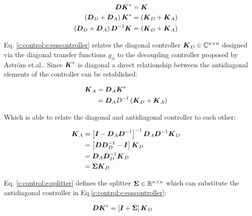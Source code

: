 \begin{align}
\begin{split}
\mbox{\boldmath$D$}\mbox{\boldmath$K$}^* &= \mbox{\boldmath$K$} \\
\left(\mbox{\boldmath$D$}_D + \mbox{\boldmath$D$}_A \right) \mbox{\boldmath$K$}^* &= \left(\mbox{\boldmath$K$}_D + \mbox{\boldmath$K$}_A \right)\\
\left(\mbox{\boldmath$D$}_D + \mbox{\boldmath$D$}_A \right) \mbox{\boldmath$D$}^{-1} \mbox{\boldmath$K$} &= \left(\mbox{\boldmath$K$}_D + \mbox{\boldmath$K$}_A \right)
\end{split}
\label{c:control:e:eqscontroller}
\end{align}

Eq. \ref{c:control:e:eqscontroller} relates the diagonal controller $\mbox{\boldmath$K$}_D \in \mathbb{C}^{n \times n}$ designed via the diagonal transfer functions $g_{ii}$  to the decoupling controller proposed by Astr\"om et.al.. Since $\mbox{\boldmath$K$}^{*}$ is diagonal a direct relationship between the antidiagonal elements of the controller can be established:

\begin{align*}
\begin{split}
\mbox{\boldmath$K$}_A &= \mbox{\boldmath$D$}_A \mbox{\boldmath$K$}^* \\
&= \mbox{\boldmath$D$}_A D^{-1} \left( \mbox{\boldmath$K$}_D + \mbox{\boldmath$K$}_A \right) \\
\end{split}
\end{align*}

Which is able to relate the diagonal and antidiagonal controller to each other:

\begin{align}
\begin{split}
\mbox{\boldmath$K$}_A &= \left[ \mbox{\boldmath$I$} - \mbox{\boldmath$D$}_A \mbox{\boldmath$D$}^{-1} \right]^{-1} \mbox{\boldmath$D$}_A \mbox{\boldmath$D$}^{-1} \mbox{\boldmath$K$}_D \\
&= \left[\mbox{\boldmath$D$} \mbox{\boldmath$D$}_D^{-1} - \mbox{\boldmath$I$} \right] \mbox{\boldmath$K$}_D \\
&= \mbox{\boldmath$D$}_A \mbox{\boldmath$D$}_D^{-1} \mbox{\boldmath$K$}_D \\
&= \mbox{\boldmath$\Sigma$} \mbox{\boldmath$K$}_D
\end{split}
\label{c:control:e:splitter}
\end{align}

Eq. \ref{c:control:e:splitter} defines the splitter $\mbox{\boldmath$\Sigma$} \in \mathbb{R}^{n \times n}$ which can substitute the antidiagonal controller in Eq.\ref{c:control:e:eqscontroller}:

\begin{align}
\begin{split}
\mbox{\boldmath$D$} \mbox{\boldmath$K$}^* &= \left[ \mbox{\boldmath$I$} + \mbox{\boldmath$\Sigma$} \right] \mbox{\boldmath$K$}_D
\end{split}
\label{c:control:e:controleqs}
\end{align}

